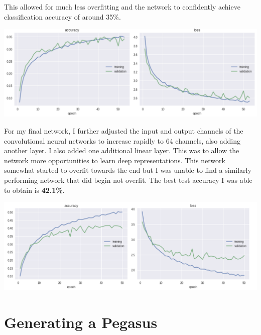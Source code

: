 \documentclass[11pt]{article}
\begin{document}
This allowed for much less overfitting and the network to confidently achieve classification accuracy of around 35\%.

     \begin{center} %
        \begin{minipage}{0.75\linewidth}
            \includegraphics[width=\linewidth]{accuracy7}
        \end{minipage}%
    \end{center}
    

For my final network, I further adjusted the input and output channels of the convolutional neural networks to increase rapidly to 64 channels, also adding another layer. I also added one additional linear layer. This was to allow the network more opportunities to learn deep representations.  This network somewhat started to overfit towards the end but I was unable to find a similarly performing network that did begin not overfit. The best test accuracy I was able to obtain is \textbf{42.1\%}.

     \begin{center} %
        \begin{minipage}{0.75\linewidth}
            \includegraphics[width=\linewidth]{accuracy9}
        \end{minipage}%
    \end{center}

\section{Generating a Pegasus}
\end{document}
